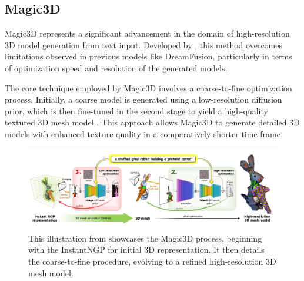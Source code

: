 
\subsection{Magic3D}\label{magic3D}

Magic3D represents a significant advancement in the domain of high-resolution 3D model generation from text input. Developed by \citeauthor{lin2023magic3d}, this method overcomes limitations observed in previous models like DreamFusion, particularly in terms of optimization speed and resolution of the generated models.

The core technique employed by Magic3D involves a coarse-to-fine optimization process. Initially, a coarse model is generated using a low-resolution diffusion prior, which is then fine-tuned in the second stage to yield a high-quality textured 3D mesh model \citep{lin2023magic3d}. This approach allows Magic3D to generate detailed 3D models with enhanced texture quality in a comparatively shorter time frame.

\begin{figure}[ht]
  \centering
    \includegraphics[width=1\columnwidth]{figures/Magic3D.png}
    \caption{This illustration from \citep{lin2023magic3d} showcases the Magic3D process, beginning with the InstantNGP for initial 3D representation. It then details the coarse-to-fine procedure, evolving to a refined high-resolution 3D mesh model.}\label{fig:figureMagic}
\end{figure}


